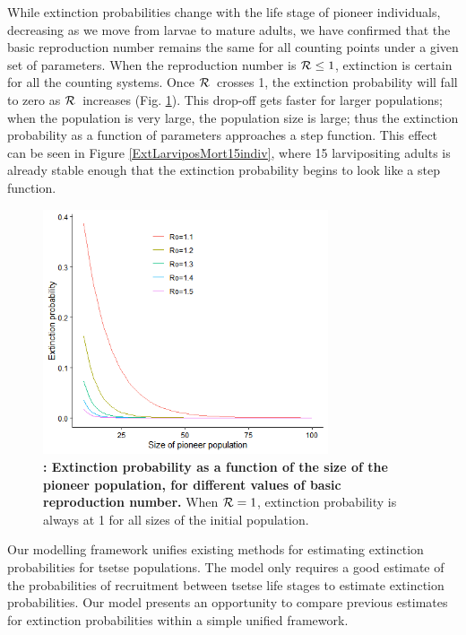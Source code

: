 \documentclass[smallextended]{svjour3}
\newcommand{\Rx}{\ensuremath{\cal R}}
\begin{document}
While extinction probabilities change with the life stage of pioneer individuals, decreasing as we move from larvae to mature adults,  we have confirmed that the basic reproduction number remains the same for all counting points under a given set of parameters. When the reproduction number is ${\cal R} \leq 1$, extinction is certain for all the counting systems. Once \Rx\ crosses 1, the extinction probability will fall to zero as \Rx\ increases (Fig. \ref{ExtPoineerSize}). This drop-off gets faster for larger populations; when the population is very large, the population size is large; thus the extinction probability as a function of parameters approaches a step function. This effect can be seen in Figure \ref{ExtLarviposMort15indiv}, where 15 larvipositing adults is already stable enough that the extinction probability begins to look like a step function.


\begin{figure}[h]
	\includegraphics[width=0.75\textwidth]{ExtinctionRepNumberPoineerPop.png}
	\caption{{\bf: Extinction probability as a function of the size of the pioneer population, for different values of basic reproduction number.} When ${\cal R}=1$, extinction probability is always at 1 for all sizes of the initial population.}
	\label{ExtPoineerSize}
\end{figure}

\newpage
Our modelling framework unifies existing methods for estimating extinction probabilities for tsetse populations. The model only requires a good estimate of the probabilities of recruitment between tsetse life stages to estimate extinction probabilities. Our model presents an opportunity to compare previous estimates for extinction probabilities within a simple unified framework.
\end{document}

